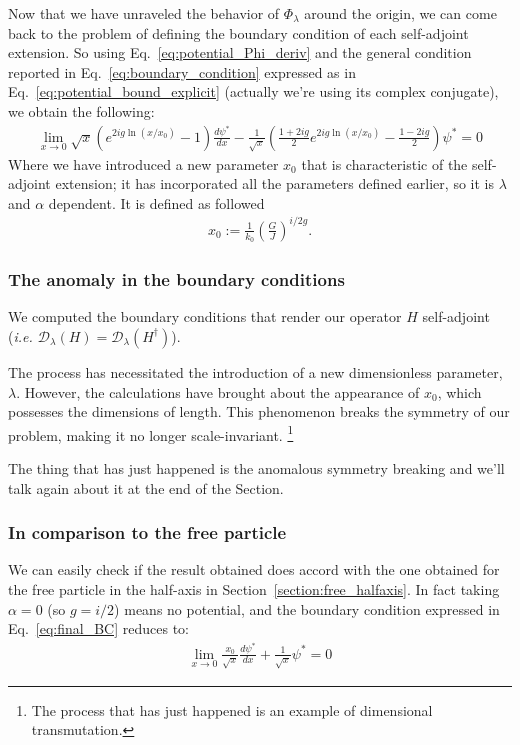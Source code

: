 \noindent
Now that we have unraveled the behavior of $\Phi_\lambda$ around the origin, we can come back to the problem of defining the boundary condition of each self-adjoint extension. So using Eq.~\eqref{eq:potential_Phi_deriv} and the general condition reported in Eq.~\eqref{eq:boundary_condition} expressed as in Eq.~\eqref{eq:potential_bound_explicit} (actually we're using its complex conjugate), we obtain the following:
\begin{align}
    \lim_{x \to 0} \sqrt{x}(e^{2ig \ln(x/x_0)} -1 ) \frac{d\psi^*}{dx} - \frac{1}{\sqrt{x}}\left(\frac{1+2ig}{2} e^{2ig \ln(x/x_0)} - \frac{1-2ig}{2} \right) \psi^* = 0
    \label{eq:final_BC}
\end{align}
Where we have introduced a new parameter $x_0$ that is characteristic of the self-adjoint extension; it has incorporated all the parameters defined earlier, so it is $\lambda$ and $\alpha$ dependent. It is defined as followed
\begin{align*}
    x_0 := \frac{1}{k_0} \left( \frac{G}{J} \right)^{i/2g}.
\end{align*}

\subsubsection*{The anomaly in the boundary conditions}

We computed the boundary conditions that render our operator $H$ self-adjoint (\textit{i.e. $\mathcal{D}_\lambda(H) = \mathcal{D}_\lambda(H^\dagger)$}).

The process has necessitated the introduction of a new dimensionless parameter, $\lambda$. However, the calculations have brought about the appearance of $x_0$, which possesses the dimensions of length. This phenomenon breaks the symmetry of our problem, making it no longer scale-invariant.
\footnote{The process that has just happened is an example of dimensional transmutation.}

\vspace{4mm}
\noindent
The thing that has just happened is the anomalous symmetry breaking and we'll talk again about it at the end of the Section.

\subsubsection*{In comparison to the free particle}

We can easily check if the result obtained does accord with the one obtained for the free particle in the half-axis in Section~\ref{section:free_halfaxis}.
In fact taking $\alpha = 0$ (so $g=i/2$) means no potential, and the boundary condition expressed in Eq.~\eqref{eq:final_BC} reduces to:
\begin{align*}
    \lim_{x \to 0} \frac{x_0}{\sqrt{x}} \frac{d\psi^*}{dx} + \frac{1}{\sqrt{x}} \psi^* = 0
\end{align*}

